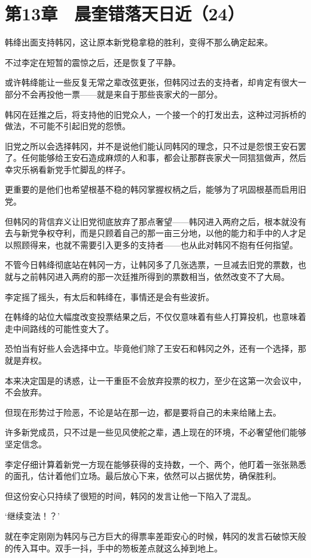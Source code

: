 \section{第13章　晨奎错落天日近（24）}

韩绛出面支持韩冈，这让原本新党稳拿稳的胜利，变得不那么确定起来。

不过李定在短暂的震惊之后，还是恢复了平静。

或许韩绛能让一些反复无常之辈改弦更张，但韩冈过去的支持者，却肯定有很大一部分不会再投他一票——就是来自于那些丧家犬的一部分。

韩冈在廷推之后，将支持他的旧党众人，一个接一个的打发出去，这种过河拆桥的做法，不可能不引起旧党的怨愤。

旧党之所以会选择韩冈，并不是说他们能认同韩冈的理念，只不过是怨恨王安石罢了。任何能够给王安石造成麻烦的人和事，都会让那群丧家犬一同狺狺做声，然后幸灾乐祸看新党手忙脚乱的样子。

更重要的是他们也希望根基不稳的韩冈掌握权柄之后，能够为了巩固根基而启用旧党。

但韩冈的背信弃义让旧党彻底放弃了那点奢望——韩冈进入两府之后，根本就没有去与新党争权夺利，而是只顾着自己的那一亩三分地，以他的能力和手中的人才足以照顾得来，也就不需要引入更多的支持者——也从此对韩冈不抱有任何指望。

不管今日韩绛彻底站在韩冈一方，让韩冈多了几张选票，一旦减去旧党的票数，也就与之前韩冈进入两府的那一次廷推所得到的票数相当，依然改变不了大局。

李定摇了摇头，有太后和韩绛在，事情还是会有些波折。

在韩绛的站位大幅度改变投票结果之后，不仅仅意味着有些人打算投机，也意味着走中间路线的可能性变大了。

恐怕当有好些人会选择中立。毕竟他们除了王安石和韩冈之外，还有一个选择，那就是弃权。

本来决定国是的诱惑，让一干重臣不会放弃投票的权力，至少在这第一次会议中，不会放弃。

但现在形势过于险恶，不论是站在那一边，都是要将自己的未来给赌上去。

许多新党成员，只不过是一些见风使舵之辈，遇上现在的环境，不必奢望他们能够坚定信念。

李定仔细计算着新党一方现在能够获得的支持数，一个、两个，他盯着一张张熟悉的面孔，估计着他们立场。最后放心下来，依然可以占据优势，确保胜利。

但这份安心只持续了很短的时间，韩冈的发言让他一下陷入了混乱。

‘继续变法！？’

就在李定刚刚为韩冈与己方巨大的得票率差距安心的时候，韩冈的发言石破惊天般的传入耳中。双手一抖，手中的笏板差点就这么掉到地上。

